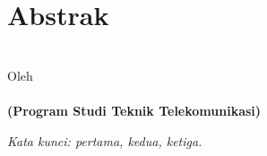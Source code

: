 \clearpage
\chapter*{Abstrak}

\begin{center}
	\linespread{1}
	\large{\bfseries{
			\MakeUppercase\thetitle
		}
	}\\[1\baselineskip]
	
	\normalsize{Oleh\\}
	\large{ 
		\bfseries \theauthor\\
		(Program Studi Teknik Telekomunikasi)
	}\\[2\baselineskip]
\end{center}

\medskip

\begin{spacing}{1.0}
	
	\blindtext
	
	\blindtext
	
	\textit{Kata kunci: pertama, kedua, ketiga.}
	
\end{spacing}

\clearpage
